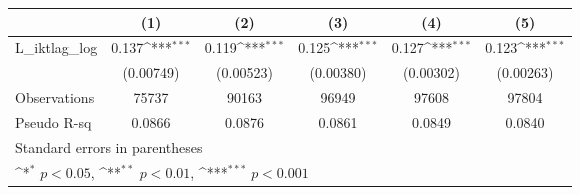 {
\def\sym#1{\ifmmode^{#1}\else\(^{#1}\)\fi}
\begin{tabular}{l*{5}{c}}
\hline\hline
                &\multicolumn{1}{c}{(1)}         &\multicolumn{1}{c}{(2)}         &\multicolumn{1}{c}{(3)}         &\multicolumn{1}{c}{(4)}         &\multicolumn{1}{c}{(5)}         \\
\hline
L\_iktlag\_log    &    0.137\sym{***}&    0.119\sym{***}&    0.125\sym{***}&    0.127\sym{***}&    0.123\sym{***}\\
                &(0.00749)         &(0.00523)         &(0.00380)         &(0.00302)         &(0.00263)         \\
\hline
Observations    &    75737         &    90163         &    96949         &    97608         &    97804         \\
Pseudo R-sq     &   0.0866         &   0.0876         &   0.0861         &   0.0849         &   0.0840         \\
\hline\hline
\multicolumn{6}{l}{\footnotesize Standard errors in parentheses}\\
\multicolumn{6}{l}{\footnotesize \sym{*} \(p<0.05\), \sym{**} \(p<0.01\), \sym{***} \(p<0.001\)}\\
\end{tabular}
}
